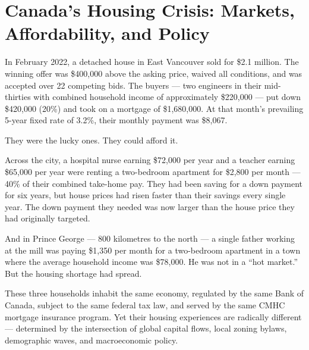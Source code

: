 
\chapter{Canada's Housing Crisis: Markets, Affordability, and Policy}
\label{ch:housing}


\noindent In February 2022, a detached house in East Vancouver sold for
\$2.1 million. The winning offer was \$400{,}000 above the asking price,
waived all conditions, and was accepted over 22 competing bids. The
buyers --- two engineers in their mid-thirties with combined household
income of approximately \$220{,}000 --- put down \$420{,}000 (20\%) and
took on a mortgage of \$1{,}680{,}000. At that month's prevailing
5-year fixed rate of 3.2\%, their monthly payment was \$8{,}067.

They were the lucky ones. They could afford it.

Across the city, a hospital nurse earning \$72{,}000 per year and a
teacher earning \$65{,}000 per year were renting a two-bedroom apartment
for \$2{,}800 per month --- 40\% of their combined take-home pay. They
had been saving for a down payment for six years, but house prices had
risen faster than their savings every single year. The down payment
they needed was now larger than the house price they had originally
targeted.

And in Prince George --- 800 kilometres to the north --- a single father
working at the mill was paying \$1{,}350 per month for a two-bedroom
apartment in a town where the average household income was \$78{,}000.
He was not in a ``hot market.'' But the housing shortage had spread.

These three households inhabit the same economy, regulated by the same
Bank of Canada, subject to the same federal tax law, and served by the
same CMHC mortgage insurance program. Yet their housing experiences are
radically different --- determined by the intersection of global capital
flows, local zoning bylaws, demographic waves, and macroeconomic policy.

